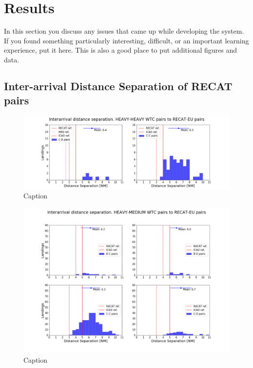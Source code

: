 \chapter{Results\label{cha:results}}

In this section you discuss any issues that came up while developing
the system.  If you found something particularly interesting,
difficult, or an important learning experience, put it here.  This is
also a good place to put additional figures and data.


\section{Inter-arrival Distance Separation of RECAT pairs}

\begin{figure}
    \centering
    \includegraphics[width=1\textwidth]{graphics/fig_HH_to_RECAT_pairs_dist_separ.png}
    \caption[list of figures caption]{Caption}
    \label{fig:HH_to_RECAT_pairs_dist_separ}
\end{figure}

\begin{figure}
    \centering
    \includegraphics[width=1\textwidth]{graphics/fig_HM_to_RECAT_pairs_dist_separ.png}
    \caption[list of figures caption]{Caption}
    \label{fig:HM_to_RECAT_pairs_dist_separ}
\end{figure}

